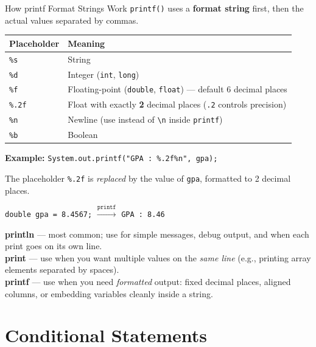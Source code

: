 \documentclass[12pt,a4paper,oneside]{book}
\begin{document}
\begin{definitionbox}{How printf Format Strings Work}
\texttt{printf()} uses a \textbf{format string} first, then the actual values separated by commas.

\begin{center}
\begin{tabular}{ll}
\toprule
\textbf{Placeholder} & \textbf{Meaning}\\
\midrule
\texttt{\%s}   & String\\
\texttt{\%d}   & Integer (\texttt{int}, \texttt{long})\\
\texttt{\%f}   & Floating-point (\texttt{double}, \texttt{float}) --- default 6 decimal places\\
\texttt{\%.2f} & Float with exactly \textbf{2} decimal places (\texttt{.2} controls precision)\\
\texttt{\%n}   & Newline (use instead of \texttt{\textbackslash n} inside \texttt{printf})\\
\texttt{\%b}   & Boolean\\
\bottomrule
\end{tabular}
\end{center}

\vspace{4pt}
\textbf{Example:} \texttt{System.out.printf("GPA : \%.2f\%n", gpa);}

The placeholder \texttt{\%.2f} is \textit{replaced} by the value of \texttt{gpa}, formatted to 2 decimal places.

\texttt{double gpa = 8.4567;} $\xrightarrow{\texttt{printf}}$ \texttt{GPA : 8.46}
\end{definitionbox}

\begin{tipbox}
\textbf{println} --- most common; use for simple messages, debug output, and when each print goes on its own line.\\[3pt]
\textbf{print} --- use when you want multiple values on the \textit{same line} (e.g., printing array elements separated by spaces).\\[3pt]
\textbf{printf} --- use when you need \textit{formatted} output: fixed decimal places, aligned columns, or embedding variables cleanly inside a string.
\end{tipbox}

\section{Conditional Statements}
\end{document}
